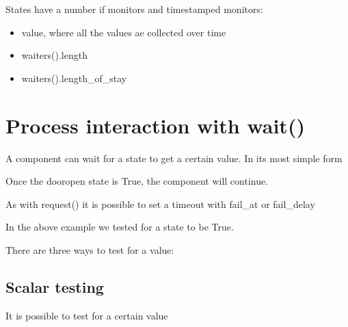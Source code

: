 \documentclass[letterpaper,10pt,english]{sphinxmanual}
\begin{document}
States have a number if monitors and timestamped monitors:
\begin{itemize}
\item {} 
value, where all the values ae collected over time

\item {} 
waiters().length

\item {} 
waiters().length\_of\_stay

\end{itemize}


\section{Process interaction with wait()}
\label{\detokenize{State:process-interaction-with-wait}}
A component can wait for a state to get a certain value. In its most simple form

\begin{sphinxVerbatim}[commandchars=\\\{\}]
 
\end{sphinxVerbatim}

Once the dooropen state is True, the component will continue.

As with request() it is possible to set a timeout with fail\_at or fail\_delay

\begin{sphinxVerbatim}[commandchars=\\\{\}]
  
 
\end{sphinxVerbatim}

In the above example we tested for a state to be True.

There are three ways to test for a value:


\subsection{Scalar testing}
\label{\detokenize{State:scalar-testing}}
It is possible to test for a certain value

\begin{sphinxVerbatim}[commandchars=\\\{\}]
  
\end{sphinxVerbatim}
\end{document}
